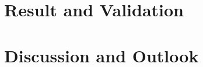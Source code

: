 \documentclass[13pt,pdftex,a4paper]{scrreprt}
\begin{document}
\chapter{Result and Validation}


\chapter{Discussion and Outlook}


\newpage
\renewcommand\chaptername{}
\printbibliography

%
\end{document}
